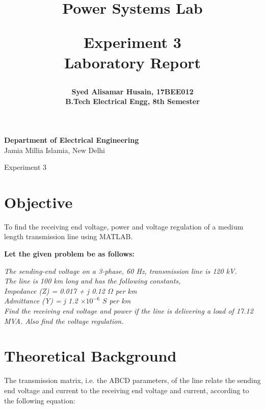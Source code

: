 \documentclass[a4paper,12pt]{article}
\title{
  {\Huge \bf Power Systems Lab}\\
  \vspace{0.25in}

  {\bf Experiment 3}\\
  Laboratory Report
  \vspace{1in}
}
\author{
  \bf Syed Alisamar Husain, 17BEE012\\
  B.Tech Electrical Engg, 8th Semester
}
\begin{document}
  \begin{titlepage}
    \maketitle
    \vspace*{\fill}
    \begin{center}
      {\bfseries Department of Electrical Engineering} \\
      Jamia Millia Islamia, New Delhi
    \end{center}
    \thispagestyle{empty}
  \end{titlepage}
  
  \newpage
  \begin{center}
    \huge Experiment 3
    \vspace{0.5in}
  \end{center}

  \section{Objective}
  To find the receiving end voltage, power and voltage regulation of a 
  medium length transmission line using MATLAB.

  {\bf Let the given problem be as follows:}
  \begin{center}
    \itshape
    The sending-end voltage on a 3-phase, 60 Hz, transmission line is 120 kV.\\
    The line is 100 km long and has the following constants,\\
    Impedance (Z) =  0.017 + j 0.12 $\Omega$ per km\\
    Admittance (Y) = j 1.2 $\times 10^{-6}$ $S$ per km\\
    Find the receiving end voltage and power if the line is delivering a 
    load of 17.12 MVA. Also find the voltage regulation.
  \end{center}

  \section{Theoretical Background}
  The transmission matrix, i.e. the ABCD parameters, of the line relate the
  sending end voltage and current to the receiving end voltage and current, according
  to the following equation:
\end{document}
